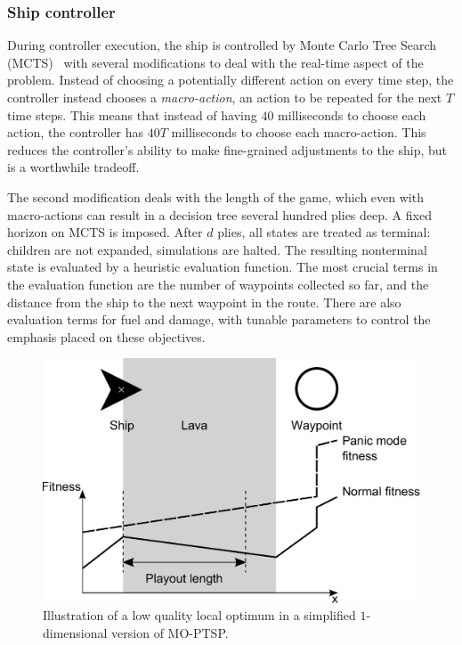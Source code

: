 \documentclass[conference]{IEEEtran}
\begin{document}
\subsubsection{Ship controller}
During controller execution,
the ship is controlled by Monte Carlo Tree Search (MCTS)~\cite{MCTSSurvey}
with several modifications to deal with the real-time aspect of the problem.
Instead of choosing a potentially different action on every time step,
the controller instead chooses a \emph{macro-action},
an action to be repeated for the next $T$ time steps.
This means that instead of having $40$ milliseconds to choose each action,
the controller has $40T$ milliseconds to choose each macro-action.
This reduces the controller's ability to make fine-grained adjustments to the ship,
but is a worthwhile tradeoff.

The second modification deals with the length of the game,
which even with macro-actions can result in a decision tree several hundred plies deep.
A fixed horizon on MCTS is imposed. After $d$ plies,
all states are treated as terminal: children are not expanded, simulations are halted.
The resulting nonterminal state is evaluated by a heuristic evaluation function.
The most crucial terms in the evaluation function are the number of waypoints collected so far, and the distance from the ship to the next waypoint in the route.
There are also evaluation terms for fuel and damage, with tunable parameters to control the emphasis placed on these objectives.

\begin{figure}%
\begin{center}
\includegraphics[width=0.9\columnwidth]{img/local-optimum.pdf}%
\caption{Illustration of a low quality local optimum in a simplified \mbox{$1$-dimensional} version of MO-PTSP.}%
\label{fig:local-optimum}%
\end{center}
\end{figure}
\end{document}
